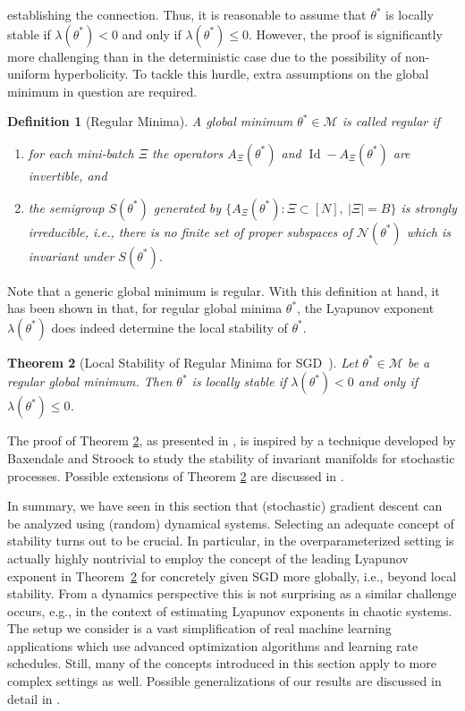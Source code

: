 \documentclass[10pt]{article}
\newtheorem{theorem}{Theorem}[section]
\newtheorem{definition}[theorem]{Definition}
\begin{document}
establishing the connection. Thus, it is reasonable to assume that $\theta^*$ is locally stable if $\lambda(\theta^*) < 0$ and only if $\lambda(\theta^*) \leq 0$. However, the proof is significantly more challenging than in the deterministic case due to the possibility of non-uniform hyperbolicity. To tackle this hurdle, extra assumptions on the global minimum in question are required.
\begin{definition}[Regular Minima]
	A global minimum $\theta^* \in \mathcal M$ is called regular if
	\begin{enumerate}
		\item[(i)] for each mini-batch $\Xi$ the operators $A_\Xi(\theta^*)$ and $\operatorname{Id}-A_\Xi(\theta^*)$ are invertible, and
		\item[(ii)] the semigroup $S(\theta^*)$ generated by $\{A_\Xi(\theta^*): \Xi \subset [N],~|\Xi| = B\}$ is strongly irreducible, i.e., there is no finite set of proper subspaces of $\mathcal N(\theta^*)$ which is invariant under $S(\theta^*)$.
	\end{enumerate}
\end{definition}

Note that a generic global minimum is regular. With this definition at hand, it has been shown in \cite{ChemnitzEngel24} that, for regular global minima $\theta^*$, the Lyapunov exponent $\lambda(\theta^*)$ does indeed determine the local stability of $\theta^*$.
\begin{theorem}[Local Stability of Regular Minima for SGD~{\cite[Theorem B]{ChemnitzEngel24}}]\label{cekk_theo:SGD}
	Let $\theta^* \in \mathcal M$ be a regular global minimum. Then $\theta^*$ is locally stable if $\lambda(\theta^*) < 0$ and only if $\lambda(\theta^*) \leq 0$.
\end{theorem}

The proof of Theorem \ref{cekk_theo:SGD}, as presented in \cite{ChemnitzEngel24}, is inspired by a technique developed by Baxendale and Stroock \cite{BaxendaleStroock88} to study the stability of invariant manifolds for stochastic processes. Possible extensions of Theorem \ref{cekk_theo:SGD} are discussed in \cite[Section~2.6]{ChemnitzEngel24}. 

In summary, we have seen in this section that (stochastic) gradient descent can be analyzed using (random) dynamical systems. Selecting an adequate concept of stability turns out to be crucial. In particular, in the overparameterized setting is actually highly nontrivial to employ the concept of the leading Lyapunov exponent in Theorem~\ref{cekk_theo:SGD} for concretely given SGD more globally, i.e., beyond local stability. From a dynamics perspective this is not surprising as a similar challenge occurs, e.g., in the context of estimating Lyapunov exponents in chaotic systems. The setup we consider is a vast simplification of real machine learning applications which use advanced optimization algorithms and learning rate schedules. Still, many of the concepts introduced in this section apply to more complex settings as well. Possible generalizations of our results are discussed in detail in \cite[Section 2.7]{ChemnitzEngel24}.
\end{document}
